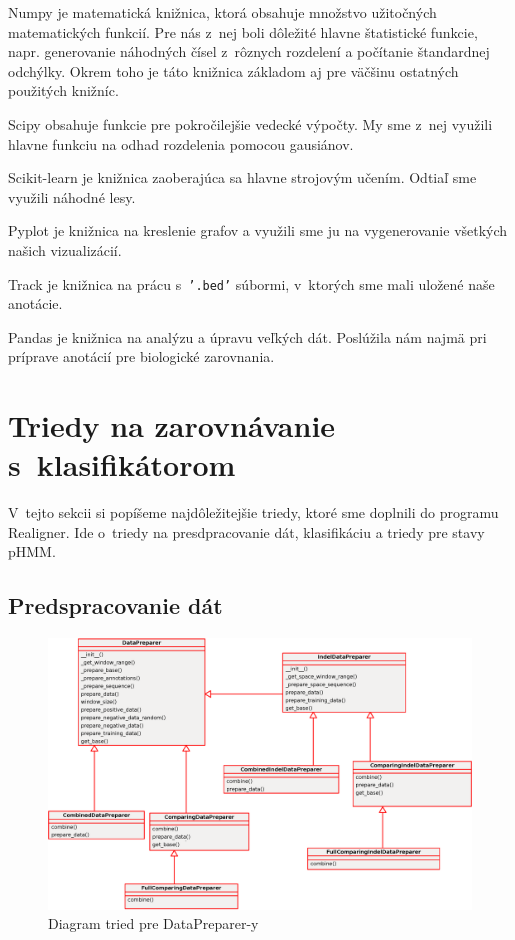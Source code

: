 Numpy je matematická knižnica, ktorá obsahuje množstvo užitočných matematických funkcií. Pre nás z~nej boli dôležité hlavne štatistické funkcie, napr. generovanie náhodných čísel z~rôznych rozdelení a počítanie štandardnej odchýlky. Okrem toho je táto knižnica základom aj pre väčšinu ostatných použitých knižníc.

Scipy obsahuje funkcie pre pokročilejšie vedecké výpočty. My sme z~nej využili hlavne funkciu na odhad rozdelenia pomocou gausiánov.

Scikit-learn je knižnica zaoberajúca sa hlavne strojovým učením. Odtiaľ sme využili náhodné lesy.

Pyplot je knižnica na kreslenie grafov a využili sme ju na vygenerovanie všetkých našich vizualizácií.

Track je knižnica na prácu s~{\tt '.bed'} súbormi, v~ktorých sme mali uložené naše anotácie.

Pandas je knižnica na analýzu a úpravu veľkých dát. Poslúžila nám najmä pri príprave anotácií pre biologické zarovnania.

\section[Triedy na zarovnávanie s~klas.]{Triedy na zarovnávanie s~klasifikátorom}

V~tejto sekcii si popíšeme najdôležitejšie triedy, ktoré sme doplnili do programu Realigner. Ide o~triedy na presdpracovanie dát, klasifikáciu a triedy pre stavy pHMM.

\subsection{Predspracovanie dát}

\begin{figure}[htp]
    \centering
    \includegraphics[width=\textwidth]{images/cls/preparers}
    \caption{Diagram tried pre DataPreparer-y}
    \label{fig:cls-preparers}
\end{figure}



